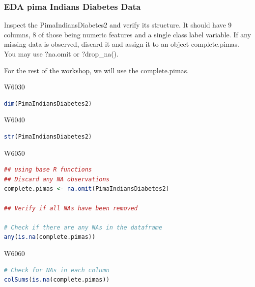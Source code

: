 \subsubsection{EDA pima Indians Diabetes Data}

\indent 

Inspect the PimaIndiansDiabetes2 and verify its structure. It should have 9 columns, 8 of those being numeric features and a single class label variable. If any missing data is observed, discard it and assign it to an object complete.pimas. You may use ?na.omit or ?drop\_na().

For the rest of the workshop, we will use the complete.pimas.


\begin{ocg}{}{W603}{0}
\begin{lstlisting}[language = R]
dim(PimaIndiansDiabetes2)
\end{lstlisting}
\end{ocg}


\begin{ocg}{}{W604}{0}
\begin{lstlisting}[language = R]
str(PimaIndiansDiabetes2)
\end{lstlisting}
\end{ocg}


\begin{ocg}{}{W605}{0}
\begin{lstlisting}[language = R]
## using base R functions 
## Discard any NA observations
complete.pimas <- na.omit(PimaIndiansDiabetes2)

## Verify if all NAs have been removed

# Check if there are any NAs in the dataframe
any(is.na(complete.pimas))
\end{lstlisting}
\end{ocg}


\begin{ocg}{}{W606}{0}
\begin{lstlisting}[language = R]
# Check for NAs in each column
colSums(is.na(complete.pimas))
\end{lstlisting}
\end{ocg}

